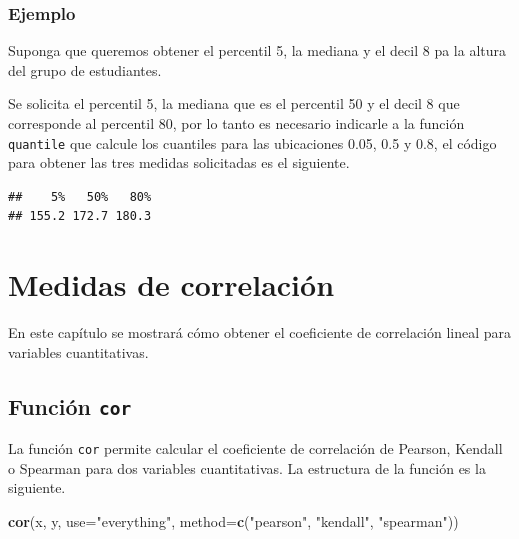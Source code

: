 \documentclass[10pt,]{krantz}
\makeatletter
\newenvironment{Shaded}{\begin{snugshade}}{\end{snugshade}}
\newcommand{\KeywordTok}[1]{\textcolor[rgb]{0.13,0.29,0.53}{\textbf{{#1}}}}
\newcommand{\DataTypeTok}[1]{\textcolor[rgb]{0.13,0.29,0.53}{{#1}}}
\newcommand{\FloatTok}[1]{\textcolor[rgb]{0.00,0.00,0.81}{{#1}}}
\newcommand{\StringTok}[1]{\textcolor[rgb]{0.31,0.60,0.02}{{#1}}}
\newcommand{\NormalTok}[1]{{#1}}
\newenvironment{kframe}{%
\medskip{}
\setlength{\fboxsep}{.8em}
 \def\at@end@of@kframe{}%
 \ifinner\ifhmode%
  \def\at@end@of@kframe{\end{minipage}}%
  \begin{minipage}{\columnwidth}%
 \fi\fi%
 \def\FrameCommand##1{\hskip\@totalleftmargin \hskip-\fboxsep
 \colorbox{shadecolor}{##1}\hskip-\fboxsep
     \hskip-\linewidth \hskip-\@totalleftmargin \hskip\columnwidth}%
 \MakeFramed {\advance\hsize-\width
   \@totalleftmargin\z@ \linewidth\hsize
   \@setminipage}}%
 {\par\unskip\endMakeFramed%
 \at@end@of@kframe}
\renewenvironment{Shaded}{\begin{kframe}}{\end{kframe}}
\makeatother
\begin{document}
\subsection*{Ejemplo}\label{ejemplo-42}


Suponga que queremos obtener el percentil 5, la mediana y el decil 8 pa
la altura del grupo de estudiantes.

Se solicita el percentil 5, la mediana que es el percentil 50 y el decil
8 que corresponde al percentil 80, por lo tanto es necesario indicarle a
la función \texttt{quantile} que calcule los cuantiles para las
ubicaciones 0.05, 0.5 y 0.8, el código para obtener las tres medidas
solicitadas es el siguiente.

\begin{Shaded}
\end{Shaded}

\begin{verbatim}
##    5%   50%   80% 
## 155.2 172.7 180.3
\end{verbatim}

\chapter{\texorpdfstring{Medidas de correlación
\label{correl}}{Medidas de correlación }}\label{medidas-de-correlacion}

En este capítulo se mostrará cómo obtener el coeficiente de correlación
lineal para variables cuantitativas.

\section{\texorpdfstring{Función \texttt{cor} 
}{Función cor  }}\label{funcion-cor}

La función \texttt{cor} permite calcular el coeficiente de correlación
de Pearson, Kendall o Spearman para dos variables cuantitativas. La
estructura de la función es la siguiente.

\begin{Shaded}
\begin{Highlighting}[]
\KeywordTok{cor}\NormalTok{(x, y, }\DataTypeTok{use=}\StringTok{"everything"}\NormalTok{,}
    \DataTypeTok{method=}\KeywordTok{c}\NormalTok{(}\StringTok{"pearson"}\NormalTok{, }\StringTok{"kendall"}\NormalTok{, }\StringTok{"spearman"}\NormalTok{))}
\end{Highlighting}
\end{Shaded}
\end{document}
